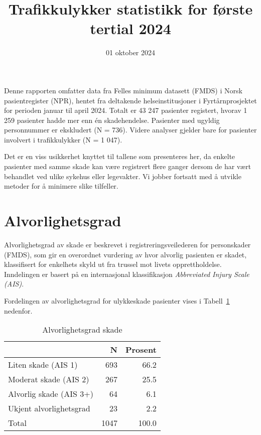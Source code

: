 \documentclass[
  letterpaper,
  DIV=11,
  numbers=noendperiod]{scrartcl}
\title{Trafikkulykker statistikk for første tertial 2024}
\subtitle{01 oktober 2024}
\author{}
\date{}
\begin{document}
\maketitle


Denne rapporten omfatter data fra Felles minimum datasett (FMDS) i Norsk
pasientregister (NPR), hentet fra deltakende helseinstitusjoner i
Fyrtårnprosjektet for perioden januar til april 2024. Totalt er 43 247
pasienter registert, hvorav 1 259 pasienter hadde mer enn én
skadehendelse. Pasienter med ugyldig personnummer er ekskludert (N =
736). Videre analyser gjelder bare for pasienter involvert i
trafikkulykker (N = 1 047).

Det er en viss usikkerhet knyttet til tallene som presenteres her, da
enkelte pasienter med samme skade kan være registrert flere ganger
dersom de har vært behandlet ved ulike sykehus eller legevakter. Vi
jobber fortsatt med å utvikle metoder for å minimere slike tilfeller.

\section{Alvorlighetsgrad}\label{alvorlighetsgrad}

Alvorlighetsgrad av skade er beskrevet i registreringsveilederen for
personskader (FMDS), som gir en overordnet vurdering av hvor alvorlig
pasienten er skadet, klassifisert for enkelhets skyld ut fra trussel mot
livets opprettholdelse. Inndelingen er basert på en internasjonal
klassifikasjon \emph{Abbreviated Injury Scale (AIS)}.

Fordelingen av alvorlighetsgrad for ulykkeskade pasienter vises i
Tabell~\ref{tbl-alvorlig} nedenfor.

\begingroup
\fontsize{12.0pt}{14.4pt}\selectfont

\begin{longtable}{lrr}

\caption{\label{tbl-alvorlig}Alvorlighetsgrad skade}

\tabularnewline

\toprule
  & N & Prosent \\ 
\midrule\addlinespace[2.5pt]
Liten skade (AIS 1) & 693 & 66.2 \\ 
Moderat skade (AIS 2) & 267 & 25.5 \\ 
Alvorlig skade (AIS 3+) & 64 & 6.1 \\ 
Ukjent alvorlighetsgrad & 23 & 2.2 \\ 
Total & 1047 & 100.0 \\ 
\bottomrule

\end{longtable}
\end{document}
